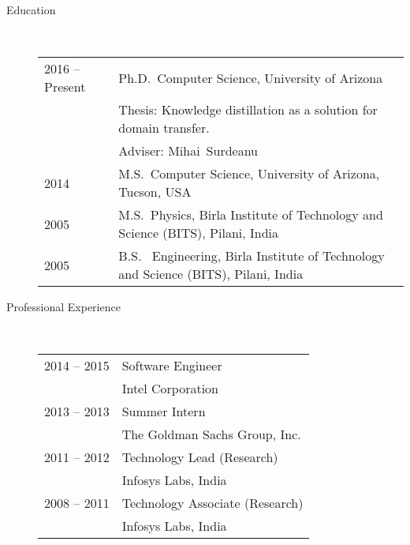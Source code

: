 \documentclass[10pt]{article}
\begin{document}
\begin{description}

\item [Education]\

\begin{tabular}{lp{4.5in}}
\hspace{-.2cm}2016 -- Present &  Ph.D.~Computer Science, {\sc University of Arizona}
\\\vspace{.0cm}&Thesis: Knowledge distillation as a solution for domain transfer. 
\\\vspace{.1cm}& Adviser: Mihai~Surdeanu\\
\vspace{.1cm}\hspace{-.2cm}2014 &  M.S.~Computer Science, {\sc University of Arizona, Tucson, USA} \\
\vspace{.1cm}\hspace{-.2cm}2005 &  M.S.~Physics, {\sc Birla Institute of Technology and Science (BITS), Pilani, India} \\
\hspace{-.2cm}2005 & B.S.~ Engineering,  {\sc Birla Institute of Technology and Science (BITS), Pilani, India}
\end{tabular}


\item [Professional Experience]\

\begin{tabular}{lp{4.9in}}


\hspace{-.2cm}2014 -- 2015 & Software Engineer\\\vspace{.1cm}
& {\sc Intel Corporation} \\

\hspace{-.2cm}2013 -- 2013 & Summer Intern\\\vspace{.1cm}
& {\sc The Goldman Sachs Group, Inc.} \\

\hspace{-.2cm}2011 -- 2012 & Technology Lead (Research)\\\vspace{.1cm}
&  {\sc Infosys Labs, India} \\

\hspace{-.2cm}2008 -- 2011 & Technology Associate (Research)\\\vspace{.1cm}
& {\sc Infosys Labs, India} \\


\end{tabular}
\end{description}
\end{document}
